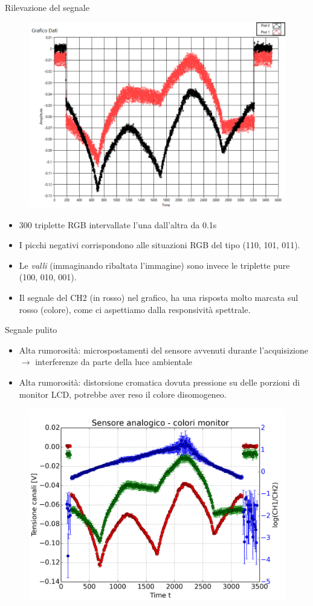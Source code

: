 \documentclass{beamer}
\begin{document}
\begin{frame}{Rilevazione del segnale}
\begin{figure}
\centering
\includegraphics[width=0.4\linewidth]{./analog_monitor_colori}
\label{fig:analog_monitor_colori}
\end{figure}

\fontsize{9}{11}
\begin{itemize}
\item 300 triplette RGB intervallate l'una dall'altra da 0.1s
\item I picchi negativi corrispondono alle situazioni RGB del tipo (110, 101, 011).
\item Le \textit{valli} (immaginando ribaltata l'immagine) sono invece le triplette pure (100, 010, 001).
\item Il segnale del CH2 (in rosso) nel grafico, ha una risposta molto marcata sul rosso (colore), come ci aspettiamo dalla responsività spettrale.
\end{itemize}
\end{frame}

\begin{frame}{Segnale pulito}
\fontsize{9}{11}
\begin{itemize}
\item Alta rumorosità: microspostamenti del sensore avvenuti durante l'acquisizione $\rightarrow$ interferenze da parte della luce ambientale
\item Alta rumorosità: distorsione cromatica dovuta pressione su delle porzioni di monitor LCD, potrebbe aver reso il colore disomogeneo.
\end{itemize}
\begin{figure}
\centering
\includegraphics[width=0.6\linewidth]{./analog_segnale_log_average}
\label{fig:analog_segnale_log_average}
\end{figure}
\end{frame}
\end{document}
